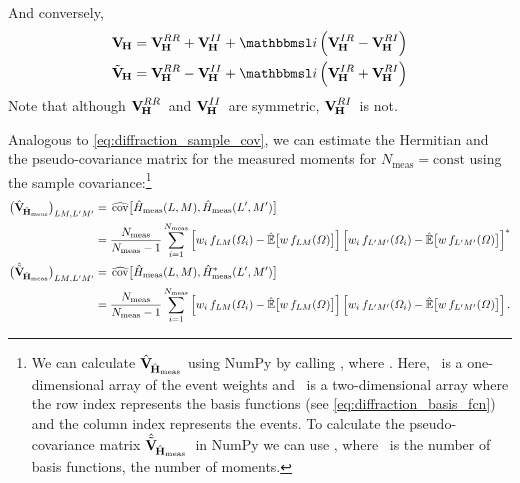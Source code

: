 And conversely,
\begin{align}
  \covMatSym_{\!\vect{H}}
  = \covMatSym_{\!\vect{H}}^{RR} + \covMatSym_{\!\vect{H}}^{II} + \imag \rBrk{\covMatSym_{\!\vect{H}}^{IR} - \covMatSym_{\!\vect{H}}^{RI}}
  \\
  \tilde{\covMatSym}_{\!\vect{H}}
  = \covMatSym_{\!\vect{H}}^{RR} - \covMatSym_{\!\vect{H}}^{II} + \imag \rBrk{\covMatSym_{\!\vect{H}}^{IR} + \covMatSym_{\!\vect{H}}^{RI}}
\end{align}
Note that although $\bm{\mathrm{V}}_{\!\bm{\mathrm{H}}}^{RR}$~and
$\bm{\mathrm{V}}_{\!\bm{\mathrm{H}}}^{II}$~are symmetric,
$\bm{\mathrm{V}}_{\!\bm{\mathrm{H}}}^{RI}$~is not.

Analogous to \cref{eq:diffraction_sample_cov}, we can estimate the
Hermitian and the pseudo-covariance matrix for the measured moments
for $N_\text{meas} = \text{const}$ using the sample
covariance:\footnote{We can calculate
$\hat{\bm{\mathrm{V}}}_{\!\hat{\bm{\mathrm{H}}}_\text{meas}}$ using NumPy by calling
, where .  Here, ~is a one-dimensional array of the event
weights and ~is a two-dimensional array where the row
index represents the basis functions (see
\cref{eq:diffraction_basis_fcn}) and the column index represents the
events.  To calculate the pseudo-covariance matrix
$\hat{\tilde{\bm{\mathrm{V}}}}_{\!\hat{\bm{\mathrm{H}}}_\text{meas}}$~in NumPy we
can use , where ~is the number
of basis functions, \ie the number of moments.}
\begin{align}
  \rBrk[1]{\covMatEstSym_{\!\hat{\vect{H}}_\text{meas}}}_{L M, L' M'}
  ={}& \covEst[1]{\hat{H}_\text{meas}(L, M), \hat{H}_\text{meas}(L', M')} \nonumber
  \\
  \label{eq:diffraction_sample_cov_hermit_meas}
  ={}& \frac{N_\text{meas}}{N_\text{meas} - 1} \sum_{i = 1}^{N_\text{meas}}
  \sBrk[2]{w_i\, f_{L M}(\Omega_i) - \exptValEst[1]{w\, f_{L M}(\Omega)}} \sBrk[2]{w_i\, f_{L' M'}(\Omega_i) - \exptValEst[1]{w\, f_{L' M'}(\Omega)}}^*
  \\
  \rBrk[1]{\hat{\tilde{\covMatSym}}_{\!\hat{\vect{H}}_\text{meas}}}_{L M, L' M'}
  ={}& \covEst[1]{\hat{H}_\text{meas}(L, M), \hat{H}_\text{meas}^*(L', M')} \nonumber
  \\
  \label{eq:diffraction_sample_cov_pseudo_meas}
  ={}& \frac{N_\text{meas}}{N_\text{meas} - 1} \sum_{i = 1}^{N_\text{meas}}
  \sBrk[2]{w_i\, f_{L M}(\Omega_i) - \exptValEst[1]{w\, f_{L M}(\Omega)}} \sBrk[2]{w_i\, f_{L' M'}(\Omega_i) - \exptValEst[1]{w\, f_{L' M'}(\Omega)}}.
\end{align}
